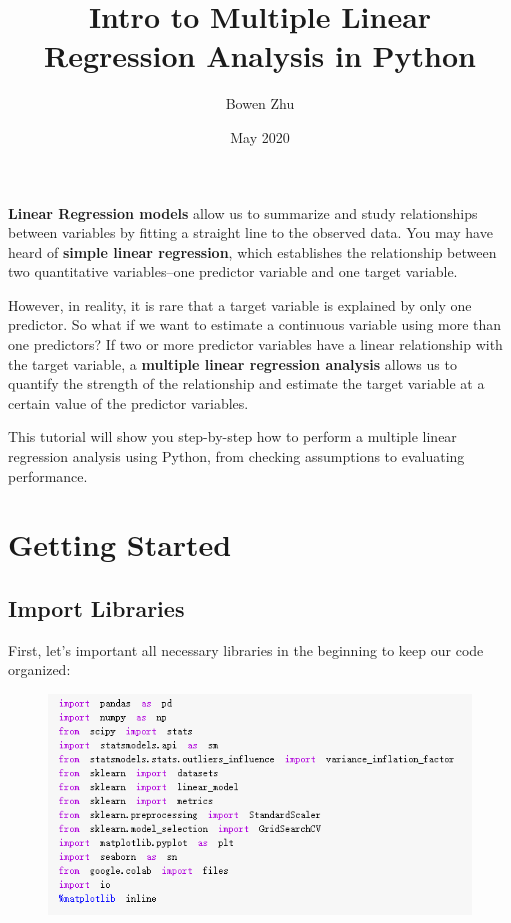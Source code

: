 \documentclass{article}
\title{Intro to Multiple Linear Regression Analysis in Python}
\author{Bowen Zhu}
\date{May 2020}
\begin{document}
\maketitle

\textbf{Linear Regression models} allow us to summarize and study relationships between variables by fitting a straight line to the observed data. You may have heard of \textbf{simple linear regression}, which establishes the relationship between two quantitative variables--one predictor variable and one target variable.

However, in reality, it is rare that a target variable is explained by only one predictor. So what if we want to estimate a continuous variable using more than one predictors? If two or more predictor variables have a linear relationship with the target variable, a \textbf{multiple linear regression analysis} allows us to quantify the strength of the relationship and estimate the target variable at a certain value of the predictor variables.

This tutorial will show you step-by-step how to perform a multiple linear regression analysis using Python, from checking assumptions to evaluating performance.
\section*{Getting Started}
\subsection*{Import Libraries}
First, let's important all necessary libraries in the beginning to keep our code organized:
\begin{figure}[H]\includegraphics[width=\linewidth]{1}\end{figure}
\restoregeometry
\end{document}
